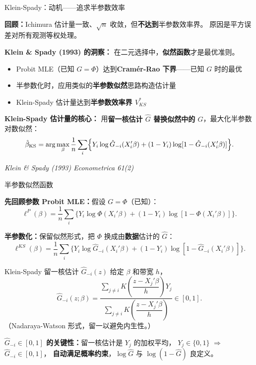 \documentclass[aspectratio=169, 10pt]{beamer}
\begin{document}
\begin{frame}{Klein-Spady：动机——追求半参数效率}

  \textbf{回顾：}Ichimura 估计量一致、$\sqrt{n}$ 收敛，但\textbf{不达到}半参数效率界。
  原因是平方误差对所有观测等权处理。

  \begin{keybox}
    \textbf{Klein \& Spady (1993) 的洞察：}
    在二元选择中，\textbf{似然函数}才是最优准则。
    \begin{itemize}\setlength{\itemsep}{1pt}
      \item Probit MLE（已知 $G = \Phi$）达到\textbf{Cramér-Rao 下界}——已知 $G$ 时的最优
      \item 半参数化时，应用类似的\textbf{半参数似然}思路构造估计量
      \item Klein-Spady 估计量达到\textbf{半参数效率界 $V^{*}_{KS}$}
    \end{itemize}
  \end{keybox}

  \begin{highlightbox}
    \textbf{Klein-Spady 估计量的核心：}
    用\textbf{留一核估计 $\hat G$ 替换似然中的 $G$}，最大化半参数对数似然：
    $$\hat\beta_{\text{KS}} = \arg\max_\beta \frac{1}{n}\sum_i \Bigl\{
    Y_i \log \hat G_{-i}(X_i'\beta) + (1 - Y_i) \log [1 - \hat G_{-i}(X_i'\beta)]\Bigr\}.$$
  \end{highlightbox}

  \hfill{\scriptsize\textit{Klein \& Spady (1993) Econometrica 61(2)}}

\end{frame}

\begin{frame}[shrink=15]{半参数似然函数}

  \textbf{先回顾参数 Probit MLE：}假设 $G = \Phi$（已知）：
  $$\ell^{P}(\beta) = \frac{1}{n}\sum_i \bigl\{Y_i \log \Phi(X_i'\beta) + (1-Y_i)\log[1 - \Phi(X_i'\beta)]\bigr\}.$$

  \textbf{半参数化：}保留似然形式，把 $\Phi$ 换成由\textbf{数据}估计的 $\hat G$：
  $$\ell^{KS}(\beta) = \frac{1}{n}\sum_i \bigl\{Y_i \log \hat G_{-i}(X_i'\beta) + (1-Y_i)\log[1 - \hat G_{-i}(X_i'\beta)]\bigr\}.$$

  \begin{definitionbox}{{Klein-Spady 留一核估计 $\hat G_{-i}(z)$}}
    给定 $\beta$ 和带宽 $h$，
    $$\hat G_{-i}(z; \beta) =
    \frac{\sum_{j \neq i} K\!\left(\dfrac{z - X_j'\beta}{h}\right) Y_j}
         {\sum_{j \neq i} K\!\left(\dfrac{z - X_j'\beta}{h}\right)}
    \in [0, 1].$$
    （Nadaraya-Watson 形式，留一以避免内生性。）
  \end{definitionbox}

  \begin{keybox}
    \textbf{$\hat G_{-i} \in [0,1]$ 的关键性：}留一核估计是 $Y_j$ 的加权平均，
    $Y_j \in \{0,1\}$ $\Rightarrow$ $\hat G_{-i} \in [0,1]$，
    \textbf{自动满足概率约束}，$\log \hat G$ 与 $\log(1 - \hat G)$ 良定义。
  \end{keybox}

\end{frame}
\end{document}
